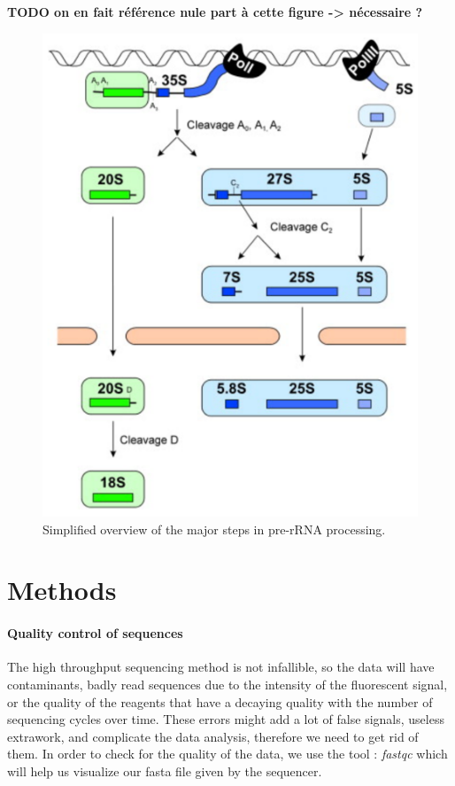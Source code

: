 \documentclass[10pt,a4paper]{article}
\begin{document}
\textbf{TODO on en fait référence nule part à cette figure -> nécessaire ?}
\begin{figure}[h]
	\centering
	\includegraphics[width=0.4\linewidth]{img/tom1Intro}
	\caption{\small Simplified overview of the major steps in pre-rRNA processing.}
	\label{fig:tom1intro}
\end{figure}






\section*{Methods}

\paragraph{Quality control of sequences} The high throughput sequencing method is not infallible, so the data will have contaminants, badly read sequences due to the intensity of the fluorescent signal, or the quality of the reagents that have a decaying quality with the number of sequencing cycles over time\cite{abnizova_computational_2017}. These errors might add a lot of false signals, useless extrawork, and complicate the data analysis, therefore we need to get rid of them. In order to check for the quality of the data, we use the tool : \textit{fastqc}\cite{andrews2012} which will help us visualize our fasta file given by the sequencer. \\
\end{document}
